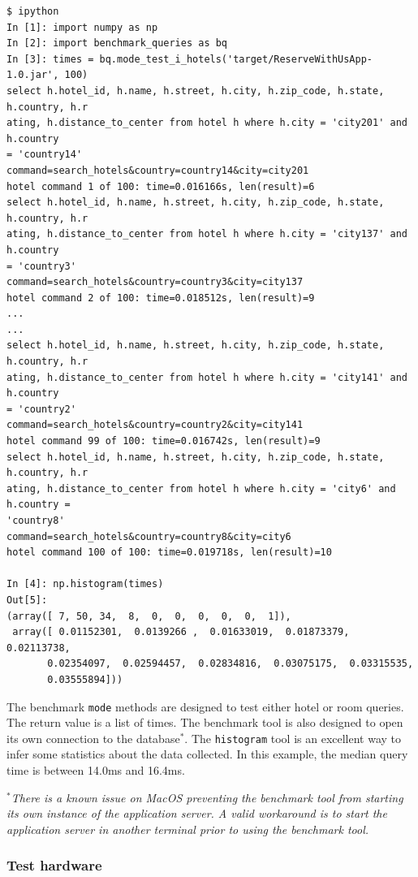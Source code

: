 \documentclass[letterpaper]{article}%
\begin{document}
\begin{Verbatim}[frame=single]
$ ipython
In [1]: import numpy as np
In [2]: import benchmark_queries as bq
In [3]: times = bq.mode_test_i_hotels('target/ReserveWithUsApp-1.0.jar', 100)
select h.hotel_id, h.name, h.street, h.city, h.zip_code, h.state, h.country, h.r
ating, h.distance_to_center from hotel h where h.city = 'city201' and h.country 
= 'country14'
command=search_hotels&country=country14&city=city201
hotel command 1 of 100: time=0.016166s, len(result)=6
select h.hotel_id, h.name, h.street, h.city, h.zip_code, h.state, h.country, h.r
ating, h.distance_to_center from hotel h where h.city = 'city137' and h.country 
= 'country3'
command=search_hotels&country=country3&city=city137
hotel command 2 of 100: time=0.018512s, len(result)=9
...
...
select h.hotel_id, h.name, h.street, h.city, h.zip_code, h.state, h.country, h.r
ating, h.distance_to_center from hotel h where h.city = 'city141' and h.country 
= 'country2'
command=search_hotels&country=country2&city=city141
hotel command 99 of 100: time=0.016742s, len(result)=9
select h.hotel_id, h.name, h.street, h.city, h.zip_code, h.state, h.country, h.r
ating, h.distance_to_center from hotel h where h.city = 'city6' and h.country = 
'country8'
command=search_hotels&country=country8&city=city6
hotel command 100 of 100: time=0.019718s, len(result)=10

In [4]: np.histogram(times)
Out[5]:
(array([ 7, 50, 34,  8,  0,  0,  0,  0,  0,  1]),
 array([ 0.01152301,  0.0139266 ,  0.01633019,  0.01873379,  0.02113738,
       0.02354097,  0.02594457,  0.02834816,  0.03075175,  0.03315535,
       0.03555894]))
\end{Verbatim}

The benchmark \texttt{mode} methods are designed to test either hotel or room
queries. The return value is a list of times. The benchmark tool is also
designed to open its own connection to the database$^*$. The \texttt{histogram}
tool is an excellent way to infer some statistics about the data collected. In
this example, the median query time is between 14.0ms and 16.4ms.

\vspace{1em}
{\small
\textsl{$^*$There is a known issue on MacOS preventing the benchmark tool from
starting its own instance of the application server.  A valid workaround is to
start the application server in another terminal prior to using the benchmark
tool.}
}

\subsubsection{Test hardware}
\end{document}
